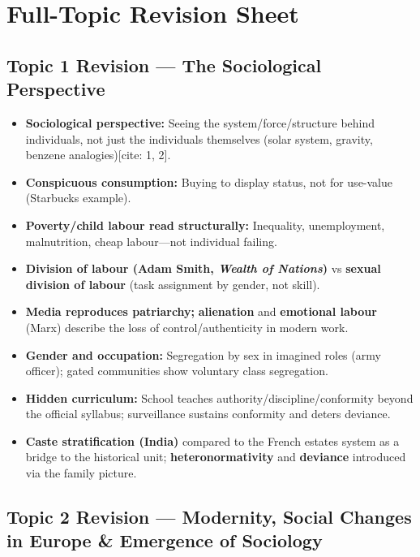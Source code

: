 \sectiondivider

\section{Full-Topic Revision Sheet}

\subsection{Topic 1 Revision --- The Sociological Perspective}

\begin{QuickRevision}
\begin{itemize}
    \item \textbf{Sociological perspective:} Seeing the system/force/structure behind individuals, not just the individuals themselves (solar system, gravity, benzene analogies)[cite: 1, 2].
    \item \textbf{Conspicuous consumption:} Buying to display status, not for use-value (Starbucks example).
    \item \textbf{Poverty/child labour read structurally:} Inequality, unemployment, malnutrition, cheap labour---not individual failing.
    \item \textbf{Division of labour (Adam Smith, \textit{Wealth of Nations})} vs \textbf{sexual division of labour} (task assignment by gender, not skill).
    \item \textbf{Media reproduces patriarchy;} \textbf{alienation} and \textbf{emotional labour} (Marx) describe the loss of control/authenticity in modern work.
    \item \textbf{Gender and occupation:} Segregation by sex in imagined roles (army officer); gated communities show voluntary class segregation.
    \item \textbf{Hidden curriculum:} School teaches authority/discipline/conformity beyond the official syllabus; surveillance sustains conformity and deters deviance.
    \item \textbf{Caste stratification (India)} compared to the French estates system as a bridge to the historical unit; \textbf{heteronormativity} and \textbf{deviance} introduced via the family picture.
\end{itemize}
\end{QuickRevision}

\subsection{Topic 2 Revision --- Modernity, Social Changes in Europe \& Emergence of Sociology}

